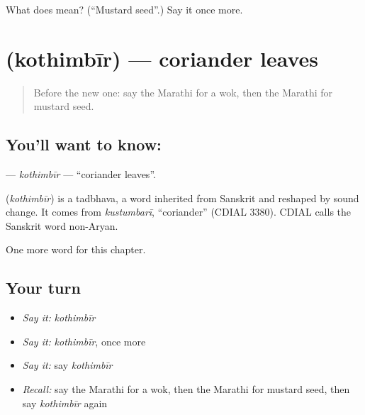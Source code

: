 \begin{tcolorbox}[breakable,colback=teal!4,colframe=teal!35!black,title={Before you move on}]
What does  mean? (\textquotedblleft{}Mustard seed\textquotedblright{}.) Say it once more.
\end{tcolorbox}
\section[\texorpdfstring{\mr{कोथिंबीर} (kothimbīr)}{कोथिंबीर (kothimbīr)}]{ (kothimbīr) — coriander leaves}

\label{lesson:MR-C244-kothimbir}



\begin{quote}
Before the new one: say the Marathi for a wok, then the Marathi for mustard seed.
\end{quote}

\subsection*{You'll want to know: }
\textbf{} — \emph{kothimbīr} — \textquotedblleft{}coriander leaves\textquotedblright{}.

\begin{cousinweb}
\textbf{} (\emph{kothimbīr}) is a tadbhava, a word inherited from Sanskrit and reshaped by sound change. It comes from \emph{kustumbarī}, \textquotedblleft{}coriander\textquotedblright{} (CDIAL 3380). CDIAL calls the Sanskrit word non-Aryan.
\end{cousinweb}

\begin{grammarlens}[title={What you've built}]
One more word for this chapter.
\end{grammarlens}

\subsection*{Your turn}
\begin{itemize}
\raggedright
  \item \emph{Say it:} \emph{kothimbīr}
  \item \emph{Say it:} \emph{kothimbīr}, once more
  \item \emph{Say it:} say \emph{kothimbīr}
  \item \emph{Recall:} say the Marathi for a wok, then the Marathi for mustard seed, then say \emph{kothimbīr} again
\end{itemize}

